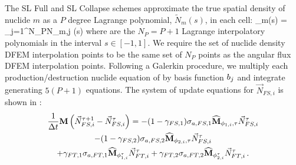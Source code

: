 The SL Full and SL Collapse schemes approximate the true spatial density of nuclide $m$ as a $P$ degree Lagrange polynomial, $\widetilde{N}_m(s)$, in each cell:
\benum
{}_m(s) = \sum_{j=1}^{N_P}{N_{m,j} (s)} \pec
\label{eq:nuc_m_unk}
\eenum
where  are the $N_P = P+1$  Lagrange interpolatory polynomials in the interval $s\in[-1,1]$.  
We require the set of nuclide density DFEM interpolation points to be the same set of $N_P$ points as the angular flux DFEM interpolation points.
Following a Galerkin procedure, we multiply each production/destruction nuclide equation of  by basis function $b_{j} $ and integrate generating  $5(P+1)$ equations.
The system of update equations for $\vec{N}_{FS,i}$ is shown in :
\begin{multline}
\frac{1}{\Delta t} \mathbf M\left(\vec{N}_{FS,i}^{\tau+1} - \vec{N}_{FS,i}^{\tau} \right) = -(1-\gamma_{FS,1})\sigma_{a,FS,1}\widehat{\mathbf M}_{\phi_{1,i},\tau}\vec{N}_{FS,i}^{\tau} \\
- (1-\gamma_{FS,2})\sigma_{a,FS,2}\widehat{\mathbf M}_{\phi_{2,i},\tau}\vec{N}_{FS,i}^{\tau} \\
+ \gamma_{FT,1}\sigma_{a,FT,1}\widehat{\mathbf M}_{\phi_{1,i}^{\tau}}\vec{N}_{FT,i}^{\tau}  + \gamma_{FT,2}\sigma_{a,FT,2}\widehat{\mathbf M}_{\phi_{2,i}^{\tau}}\vec{N}_{FT,i}^{\tau} 
\, .
\label{eq:dfem_nuclide}
\end{multline}
%
%
